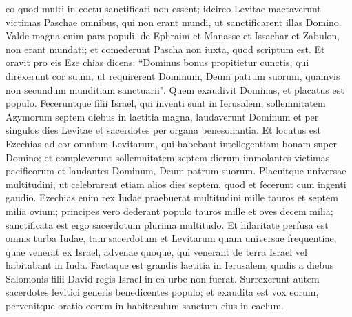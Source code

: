 \begin{biblechapter}
\verse eo quod multi in coetu sanctificati non essent; idcirco Levitae mactaverunt victimas Paschae omnibus, qui non erant mundi, ut sanctificarent illas Domino. 
\verse Valde magna enim pars populi, de Ephraim et Manasse et Issachar et Zabulon, non erant mundati; et comederunt Pascha non iuxta, quod scriptum est. Et oravit pro eis Eze chias dicens: “Dominus bonus propitietur 
\verse cunctis, qui direxerunt cor suum, ut requirerent Dominum, Deum patrum suorum, quamvis non secundum munditiam sanctuarii". 
\verse Quem exaudivit Dominus, et placatus est populo. 
\verse Feceruntque filii Israel, qui inventi sunt in Ierusalem, sollemnitatem Azymorum septem diebus in laetitia magna, laudaverunt Dominum et per singulos dies Levitae et sacerdotes per organa benesonantia. 
\verse Et locutus est Ezechias ad cor omnium Levitarum, qui habebant intellegentiam bonam super Domino; et compleverunt sollemnitatem septem dierum immolantes victimas pacificorum et laudantes Dominum, Deum patrum suorum. 
\verse Placuitque universae multitudini, ut celebrarent etiam alios dies septem, quod et fecerunt cum ingenti gaudio. 
\verse Ezechias enim rex Iudae praebuerat multitudini mille tauros et septem milia ovium; principes vero dederant populo tauros mille et oves decem milia; sanctificata est ergo sacerdotum plurima multitudo. 
\verse Et hilaritate perfusa est omnis turba Iudae, tam sacerdotum et Levitarum quam universae frequentiae, quae venerat ex Israel, advenae quoque, qui venerant de terra Israel vel habitabant in Iuda. 
\verse Factaque est grandis laetitia in Ierusalem, qualis a diebus Salomonis filii David regis Israel in ea urbe non fuerat. 
\verse Surrexerunt autem sacerdotes levitici generis benedicentes populo; et exaudita est vox eorum, pervenitque oratio eorum in habitaculum sanctum eius in caelum. 
\end{biblechapter}


